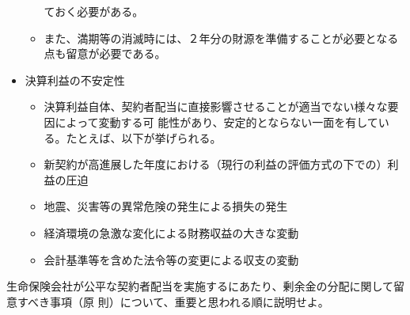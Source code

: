 \documentclass[report,gutter=10mm,fore-edge=10mm,uplatex,dvipdfmx]{jlreq}
\begin{document}
\begin{itemize}
\begin{itemize}
 ておく必要がある。
\item  また、満期等の消滅時には、２年分の財源を準備することが必要となる点も留意が必要である。
\end{itemize} 
\item 決算利益の不安定性
\begin{itemize}
 \item  決算利益自体、契約者配当に直接影響させることが適当でない様々な要因によって変動する可
 能性があり、安定的とならない一面を有している。たとえば、以下が挙げられる。
\item 新契約が高進展した年度における（現行の利益の評価方式の下での）利益の圧迫
\item 地震、災害等の異常危険の発生による損失の発生
\item 経済環境の急激な変化による財務収益の大きな変動
\item 会計基準等を含めた法令等の変更による収支の変動
\end{itemize}
\end{itemize}

生命保険会社が公平な契約者配当を実施するにあたり、剰余金の分配に関して留意すべき事項（原
則）について、重要と思われる順に説明せよ。

\end{document}
